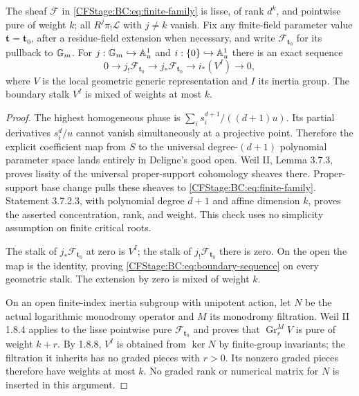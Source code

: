 \begin{proposition}
The sheaf $\mathcal F$ in \eqref{CFStage:BC:eq:finite-family} is lisse, of rank
$d^k$, and pointwise pure of weight $k$; all $R^j\pi_!\mathcal L$ with
$j\ne k$ vanish.  Fix any finite-field parameter value
$\mathbf t=\mathbf t_0$, after a residue-field extension when necessary,
and write $\mathcal F_{\mathbf t_0}$ for its pullback to ${\mathbb G_m}$.
For $j:{\mathbb G_m}\hookrightarrow\mathbb A^1_u$ and $i:\{0\}\hookrightarrow\mathbb A^1_u$
there is an exact sequence
\begin{equation}
 0\longrightarrow j_!\mathcal F_{\mathbf t_0}
  \longrightarrow j_*\mathcal F_{\mathbf t_0}
  \longrightarrow i_*(V^I)\longrightarrow0,                \label{CFStage:BC:eq:boundary-sequence}
\end{equation}
where $V$ is the local geometric generic representation and $I$ its
inertia group.  The boundary stalk $V^I$ is mixed of weights at most $k$.
\end{proposition}
\begin{proof}
The highest homogeneous phase is
$\sum_i s_i^{d+1}/((d+1)u)$.  Its partial derivatives $s_i^d/u$
cannot vanish simultaneously at a projective point.  Therefore the
explicit coefficient map from $S$ to the universal degree-$(d+1)$
polynomial parameter space lands entirely in Deligne's good open.
Weil II, Lemma 3.7.3, proves lissity of the universal proper-support
cohomology sheaves there.  Proper-support base change pulls these sheaves
to \eqref{CFStage:BC:eq:finite-family}.  Statement 3.7.2.3, with polynomial degree
$d+1$ and affine dimension $k$, proves the asserted concentration, rank,
and weight.  This check uses no simplicity assumption on finite critical
roots.

The stalk of $j_*\mathcal F_{\mathbf t_0}$ at zero is $V^I$; the stalk
of $j_!\mathcal F_{\mathbf t_0}$ there is zero.  On the open the map is
the identity, proving \eqref{CFStage:BC:eq:boundary-sequence} on every geometric
stalk.  The extension by zero is mixed of weight $k$.

On an open finite-index inertia subgroup with unipotent action, let $N$
be the actual logarithmic monodromy operator and $M$ its monodromy
filtration.  Weil II 1.8.4 applies to the lisse pointwise pure
$\mathcal F_{\mathbf t_0}$ and proves that
$\operatorname{Gr}_r^M V$ is pure of weight $k+r$.
By 1.8.8, $V^I$ is obtained from $\ker N$ by finite-group invariants;
the filtration it inherits has no graded pieces with $r>0$.
Its nonzero graded pieces therefore have weights at most $k$.
No graded rank or numerical matrix for $N$ is inserted in this argument.
\end{proof}

